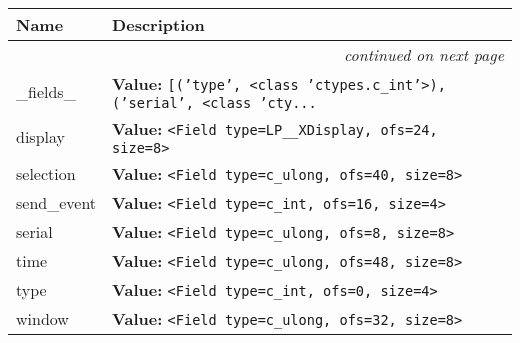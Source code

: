     \vspace{-1cm}
\hspace{\varindent}\begin{longtable}{|p{\varnamewidth}|p{\vardescrwidth}|l}
\cline{1-2}
\cline{1-2} \centering \textbf{Name} & \centering \textbf{Description}& \\
\cline{1-2}
\endhead\cline{1-2}\multicolumn{3}{r}{\small\textit{continued on next page}}\\\endfoot\cline{1-2}
\endlastfoot\raggedright \_\-f\-i\-e\-l\-d\-s\-\_\- & \raggedright \textbf{Value:} 
{\tt \texttt{[}\texttt{(}\texttt{'}\texttt{type}\texttt{'}\texttt{, }{\textless}class 'ctypes.c\_int'{\textgreater}\texttt{)}\texttt{, }\texttt{(}\texttt{'}\texttt{serial}\texttt{'}\texttt{, }{\textless}class 'cty\texttt{...}}&\\
\cline{1-2}
\raggedright d\-i\-s\-p\-l\-a\-y\- & \raggedright \textbf{Value:} 
{\tt {\textless}Field type=LP\_\_XDisplay, ofs=24, size=8{\textgreater}}&\\
\cline{1-2}
\raggedright s\-e\-l\-e\-c\-t\-i\-o\-n\- & \raggedright \textbf{Value:} 
{\tt {\textless}Field type=c\_ulong, ofs=40, size=8{\textgreater}}&\\
\cline{1-2}
\raggedright s\-e\-n\-d\-\_\-e\-v\-e\-n\-t\- & \raggedright \textbf{Value:} 
{\tt {\textless}Field type=c\_int, ofs=16, size=4{\textgreater}}&\\
\cline{1-2}
\raggedright s\-e\-r\-i\-a\-l\- & \raggedright \textbf{Value:} 
{\tt {\textless}Field type=c\_ulong, ofs=8, size=8{\textgreater}}&\\
\cline{1-2}
\raggedright t\-i\-m\-e\- & \raggedright \textbf{Value:} 
{\tt {\textless}Field type=c\_ulong, ofs=48, size=8{\textgreater}}&\\
\cline{1-2}
\raggedright t\-y\-p\-e\- & \raggedright \textbf{Value:} 
{\tt {\textless}Field type=c\_int, ofs=0, size=4{\textgreater}}&\\
\cline{1-2}
\raggedright w\-i\-n\-d\-o\-w\- & \raggedright \textbf{Value:} 
{\tt {\textless}Field type=c\_ulong, ofs=32, size=8{\textgreater}}&\\
\cline{1-2}
\end{longtable}



